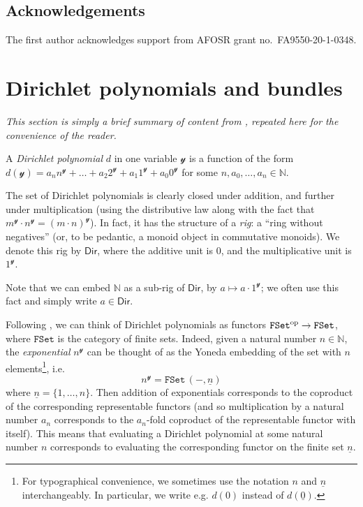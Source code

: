 \documentclass[11pt,fleqn]{article}
\newcommand{\yon}{\mathcal{y}}
\newcommand{\op}{^\textnormal{op}}
\newcommand{\cat}[1]{\mathtt{#1}}
\newcommand{\rig}[1]{\mathsf{#1}}
\newcommand{\FSet}{\cat{FSet}}
\newcommand{\Dir}{\rig{Dir}}
\begin{document}
\subsection*{Acknowledgements}

The first author acknowledges support from AFOSR grant no.~{FA9550-20-1-0348}.


\section{Dirichlet polynomials and bundles}
\label{section:dir-and-bun}

\emph{This section is simply a brief summary of content from \cite{SM2020}, repeated here for the convenience of the reader.}

\begin{definition}
  A \emph{Dirichlet polynomial} $d$ in one variable $\yon$ is a function of the form $d(\yon)=a_n n^\yon + \ldots + a_2 2^\yon + a_1 1^\yon + a_0 0^\yon$ for some $n,a_0,\ldots,a_n\in\mathbb{N}$.

  The set of Dirichlet polynomials is clearly closed under addition, and further under multiplication (using the distributive law along with the fact that $m^\yon\cdot n^\yon=(m\cdot n)^\yon$).
  In fact, it has the structure of a \emph{rig}: a ``ring without negatives'' (or, to be pedantic, a monoid object in commutative monoids).
  We denote this rig by $\Dir$, where the additive unit is $0$, and the multiplicative unit is $1^\yon$.
  
  Note that we can embed $\mathbb{N}$ as a sub-rig of $\Dir$, by $a\mapsto a\cdot1^\yon$;
  we often use this fact and simply write $a\in\Dir$.
\end{definition}

Following \cite{SM2020}, we can think of Dirichlet polynomials as functors $\FSet\op\to\FSet$, where $\FSet$ is the category of finite sets.
Indeed, given a natural number $n\in\mathbb{N}$, the \emph{exponential} $n^\yon$ can be thought of as the Yoneda embedding of the set with $n$ elements\footnote{For typographical convenience, we sometimes use the notation $n$ and $\underline{n}$ interchangeably. In particular, we write e.g. $d(0)$ instead of $d(\underline{0})$.}, i.e.
\[
  n^\yon = \FSet\,(-,\underline{n})
\]
where $\underline{n}=\{1,\ldots,n\}$.
Then addition of exponentials corresponds to the coproduct of the corresponding representable functors (and so multiplication by a natural number $a_n$ corresponds to the $a_n$-fold coproduct of the representable functor with itself).
This means that evaluating a Dirichlet polynomial at some natural number $n$ corresponds to evaluating the corresponding functor on the finite set $\underline{n}$.
\end{document}
